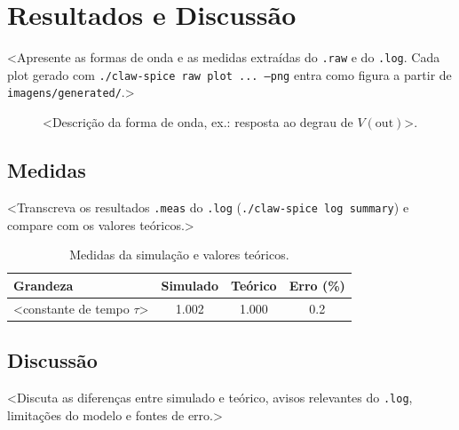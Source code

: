 \chapter{Resultados e Discussão}
\label{cap:resultados}

<Apresente as formas de onda e as medidas extraídas do \texttt{.raw} e do
\texttt{.log}. Cada plot gerado com \texttt{./claw-spice raw plot ... --png}
entra como figura a partir de \texttt{imagens/generated/}.>

\begin{figure}[htb]
  \centering
  \caption{<Descrição da forma de onda, ex.: resposta ao degrau de
  $V(\mathrm{out})$>.}
  \label{fig:resposta}
\end{figure}

\section{Medidas}
\label{sec:medidas}

<Transcreva os resultados \texttt{.meas} do \texttt{.log}
(\texttt{./claw-spice log summary}) e compare com os valores teóricos.>

\begin{table}[htb]
  \centering
  \caption{Medidas da simulação e valores teóricos.}
  \label{tab:medidas}
  \begin{tabular}{lSSS}
    \toprule
    Grandeza & {Simulado} & {Teórico} & {Erro (\%)} \\
    \midrule
    <constante de tempo $\tau$> & 1.002 & 1.000 & 0.2 \\
    \bottomrule
  \end{tabular}
\end{table}

\section{Discussão}
\label{sec:discussao}

<Discuta as diferenças entre simulado e teórico, avisos relevantes do
\texttt{.log}, limitações do modelo e fontes de erro.>
